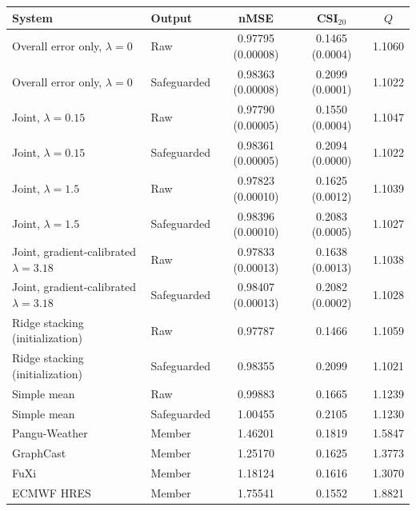 \begin{tabular}{llccc}
\hline
System & Output & nMSE & CSI$_{20}$ & $Q$ \\
\hline
Overall error only, $\lambda=0$ & Raw & 0.97795 (0.00008) & 0.1465 (0.0004) & 1.1060 \\
Overall error only, $\lambda=0$ & Safeguarded & 0.98363 (0.00008) & 0.2099 (0.0001) & 1.1022 \\
Joint, $\lambda=0.15$ & Raw & 0.97790 (0.00005) & 0.1550 (0.0004) & 1.1047 \\
Joint, $\lambda=0.15$ & Safeguarded & 0.98361 (0.00005) & 0.2094 (0.0000) & 1.1022 \\
Joint, $\lambda=1.5$ & Raw & 0.97823 (0.00010) & 0.1625 (0.0012) & 1.1039 \\
Joint, $\lambda=1.5$ & Safeguarded & 0.98396 (0.00010) & 0.2083 (0.0005) & 1.1027 \\
Joint, gradient-calibrated $\lambda=3.18$ & Raw & 0.97833 (0.00013) & 0.1638 (0.0013) & 1.1038 \\
Joint, gradient-calibrated $\lambda=3.18$ & Safeguarded & 0.98407 (0.00013) & 0.2082 (0.0002) & 1.1028 \\[5pt]
Ridge stacking (initialization) & Raw & 0.97787 & 0.1466 & 1.1059 \\
Ridge stacking (initialization) & Safeguarded & 0.98355 & 0.2099 & 1.1021 \\
Simple mean & Raw & 0.99883 & 0.1665 & 1.1239 \\
Simple mean & Safeguarded & 1.00455 & 0.2105 & 1.1230 \\
Pangu-Weather & Member & 1.46201 & 0.1819 & 1.5847 \\
GraphCast & Member & 1.25170 & 0.1625 & 1.3773 \\
FuXi & Member & 1.18124 & 0.1616 & 1.3070 \\
ECMWF HRES & Member & 1.75541 & 0.1552 & 1.8821 \\
\hline
\end{tabular}
